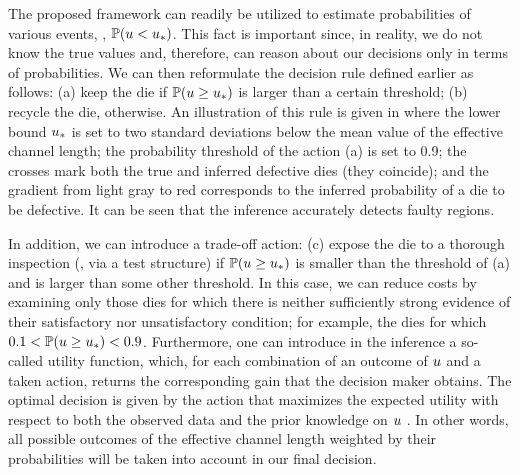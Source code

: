 The proposed framework can readily be utilized to estimate probabilities of various events, \eg, $\mathbb{P}(u < u_*)$. This fact is important since, in reality, we do not know the true values and, therefore, can reason about our decisions only in terms of probabilities. We can then reformulate the decision rule defined earlier as follows: (a) keep the die if $\mathbb{P}(u \geq u_*)$ is larger than a certain threshold; (b) recycle the die, otherwise.
An illustration of this rule is given in  where the lower bound $u_*$ is set to two standard deviations below the mean value of the effective channel length; the probability threshold of the action (a) is set to 0.9; the crosses mark both the true and inferred defective dies (they coincide); and the gradient from light gray to red corresponds to the inferred probability of a die to be defective. It can be seen that the inference accurately detects faulty regions.


In addition, we can introduce a trade-off action: (c) expose the die to a thorough inspection (\eg, via a test structure) if $\mathbb{P}(u \geq u_*)$ is smaller than the threshold of (a) and is larger than some other threshold. In this case, we can reduce costs by examining only those dies for which there is neither sufficiently strong evidence of their satisfactory nor unsatisfactory condition; for example, the dies for which $0.1 < \mathbb{P}(u \geq u_*) < 0.9$.
Furthermore, one can introduce in the inference a so-called utility function, which, for each combination of an outcome of $u$ and a taken action, returns the corresponding gain that the decision maker obtains.
The optimal decision is given by the action that maximizes the expected utility with respect to both the observed data and the prior knowledge on $u$ \cite{bernardo2007}. In other words, all possible outcomes of the effective channel length weighted by their probabilities will be taken into account in our final decision.
